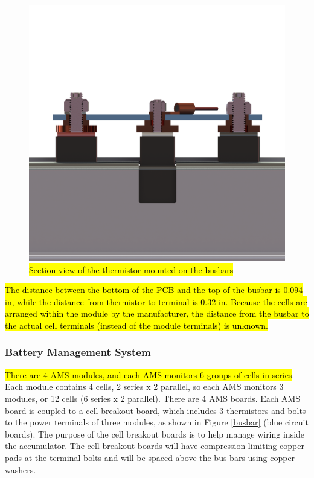 \documentclass{article}
\DeclareRobustCommand{\hlr}[1]{{\sethlcolor{red}\hl{#1}}}
\begin{document}
            \begin{figure}[H]
                \centering
                \includegraphics[width = 0.5 \textwidth]{busbarstack}
                \caption{\hlr{Section view of the thermistor mounted on the busbars}}
                \label{busbarstack}
            \end{figure}

            \hlr{The distance between the bottom of the PCB and the top of the busbar is 0.094 in, while the distance from thermistor to terminal is 0.32 in. Because the cells are arranged within the module by the manufacturer, the distance from the busbar to the actual cell terminals (instead of the module terminals) is unknown.}

        \subsubsection{Battery Management System} \label{bms}



           \hlr{There are 4 AMS modules, and each AMS monitors 6 groups of cells in series}. Each module contains 4 cells, 2 series x 2 parallel, so each AMS monitors 3 modules, or 12 cells (6 series x 2 parallel). There are 4 AMS boards. Each AMS board is coupled to a cell breakout board, which includes 3 thermistors and bolts to the power terminals of three modules, as shown in Figure \ref{busbar} (blue circuit boards). The purpose of the cell breakout boards is to help manage wiring inside the accumulator. The cell breakout boards will have compression limiting copper pads at the terminal bolts and will be spaced above the bus bars using copper washers.\\
\end{document}
